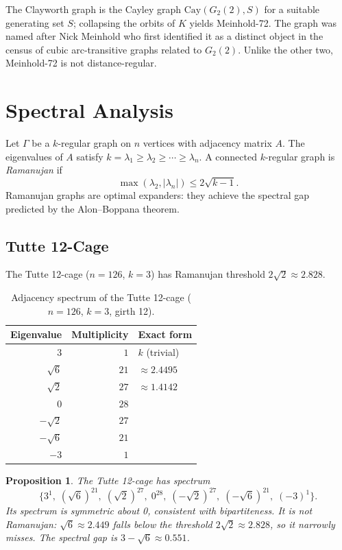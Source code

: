 \documentclass[11pt,a4paper]{article}
\theoremstyle{plain}
\newtheorem{proposition}[theorem]{Proposition}
\theoremstyle{definition}
\theoremstyle{remark}
\begin{document}
The Clayworth graph is the Cayley graph $\mathrm{Cay}(G_2(2), S)$ for a suitable
generating set $S$; collapsing the orbits of $K$ yields Meinhold-72.  The graph was
named after Nick Meinhold who first identified it as a distinct object in the census
of cubic arc-transitive graphs related to $G_2(2)$.  Unlike the other two, Meinhold-72
is not distance-regular.

\section{Spectral Analysis}

Let $\Gamma$ be a $k$-regular graph on $n$ vertices with adjacency matrix $A$.
The eigenvalues of $A$ satisfy $k = \lambda_1 \geq \lambda_2 \geq \cdots \geq \lambda_n$.
A connected $k$-regular graph is \emph{Ramanujan} if
\[
  \max(\lambda_2, |\lambda_n|) \leq 2\sqrt{k-1}.
\]
Ramanujan graphs are optimal expanders: they achieve the spectral gap predicted by
the Alon--Boppana theorem.

\subsection{Tutte 12-Cage}

The Tutte 12-cage ($n = 126$, $k = 3$) has Ramanujan threshold $2\sqrt{2} \approx 2.828$.

\begin{table}[h]
\centering
\caption{Adjacency spectrum of the Tutte 12-cage ($n=126$, $k=3$, girth 12).}
\label{tab:tutte}
\begin{tabular}{@{}rrl@{}}
\toprule
Eigenvalue & Multiplicity & Exact form \\
\midrule
$3$        & $1$  & $k$ (trivial) \\
$\sqrt{6}$ & $21$ & $\approx 2.4495$ \\
$\sqrt{2}$ & $27$ & $\approx 1.4142$ \\
$0$        & $28$ & \\
$-\sqrt{2}$& $27$ & \\
$-\sqrt{6}$& $21$ & \\
$-3$       & $1$  & \\
\bottomrule
\end{tabular}
\end{table}

\begin{proposition}
The Tutte 12-cage has spectrum
\[
  \bigl\{3^1,\; (\sqrt{6})^{21},\; (\sqrt{2})^{27},\; 0^{28},\;
  (-\sqrt{2})^{27},\; (-\sqrt{6})^{21},\; (-3)^1\bigr\}.
\]
Its spectrum is symmetric about 0, consistent with bipartiteness.
It is \emph{not} Ramanujan: $\sqrt{6} \approx 2.449$ falls below the threshold
$2\sqrt{2} \approx 2.828$, so it narrowly misses. The spectral gap is $3 - \sqrt{6} \approx 0.551$.
\end{proposition}
\end{document}
